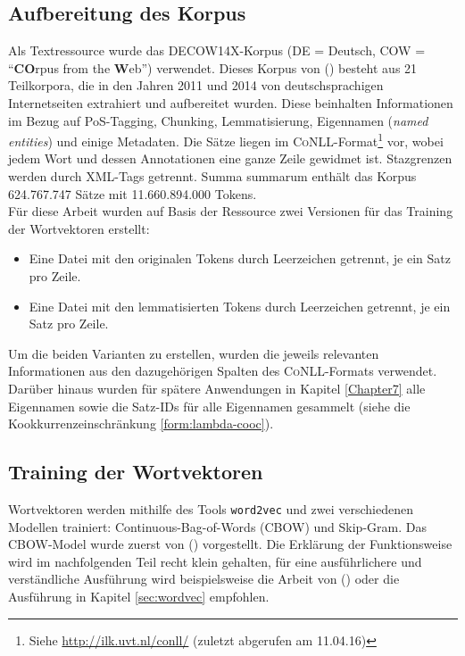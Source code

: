   \subsection{Aufbereitung des Korpus}\label{sec:corpusprep}

  Als Textressource wurde das DECOW14X-Korpus (DE = Deutsch, COW = ``\textbf{CO}rpus from the \textbf{W}eb'') verwendet.
  Dieses Korpus von (\cite{schafer2012building}) besteht aus 21 Teilkorpora,
  die in den Jahren 2011 und 2014 von deutschsprachigen Internetseiten extrahiert und aufbereitet wurden. Diese beinhalten
  Informationen im Bezug auf PoS-Tagging, Chunking, Lemmatisierung, Eigennamen (\emph{named entities}) und einige Metadaten.
  Die Sätze liegen im \textsc{CoNLL}-Format\footnote{Siehe \url{http://ilk.uvt.nl/conll/} (zuletzt abgerufen am 11.04.16)} vor,
  wobei jedem Wort und dessen Annotationen eine ganze Zeile gewidmet ist.
  Stazgrenzen werden durch XML-Tags getrennt. Summa summarum enthält das Korpus 624.767.747 Sätze mit 11.660.894.000 Tokens.\\

  Für diese Arbeit wurden auf Basis der Ressource zwei Versionen für das Training der Wortvektoren erstellt:
  \begin{itemize}
      \item Eine Datei mit den originalen Tokens durch Leerzeichen getrennt, je ein Satz pro Zeile.
      \item Eine Datei mit den lemmatisierten Tokens durch Leerzeichen getrennt, je ein Satz pro Zeile.
  \end{itemize}

  Um die beiden Varianten zu erstellen, wurden die jeweils relevanten Informationen aus den dazugehörigen Spalten des
  \textsc{CoNLL}-Formats verwendet.\\
  Darüber hinaus wurden für spätere Anwendungen in Kapitel \ref{Chapter7} alle Eigennamen sowie die Satz-IDs für
  alle Eigennamen gesammelt (siehe die Kookkurrenzeinschränkung \ref{form:lambda-cooc}).

  \subsection{Training der Wortvektoren}\label{sec:vectrain}

  Wortvektoren werden mithilfe des Tools \verb|word2vec| und zwei verschiedenen Modellen trainiert: Continuous-Bag-of-Words (CBOW)
  und Skip-Gram. Das CBOW-Model wurde zuerst von (\cite{mikolov2013efficient}) vorgestellt. Die Erklärung der Funktionsweise
  wird im nachfolgenden Teil recht klein gehalten, für eine ausführlichere und verständliche Ausführung wird beispielsweise
  die Arbeit von (\cite{rong2014word2vec}) oder die Ausführung in Kapitel \ref{sec:wordvec} empfohlen.\\

